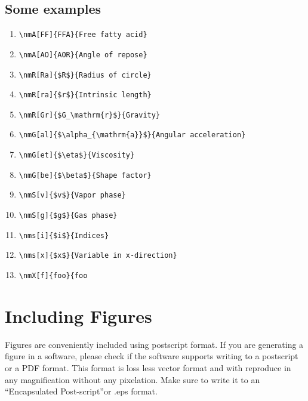 \subsection{Some examples}
\begin{enumerate}
\item \verb|\nmA[FF]{FFA}{Free fatty acid}|
\item \verb|\nmA[AO]{AOR}{Angle of repose}|
\item \verb|\nmR[Ra]{$R$}{Radius of circle}|
\item \verb|\nmR[ra]{$r$}{Intrinsic length}|
\item \verb|\nmR[Gr]{$G_\mathrm{r}$}{Gravity}|
\item \verb|\nmG[al]{$\alpha_{\mathrm{a}}$}{Angular acceleration}|
\item \verb|\nmG[et]{$\eta$}{Viscosity}|
\item \verb|\nmG[be]{$\beta$}{Shape factor}|
\item \verb|\nmS[v]{$v$}{Vapor phase}|
\item \verb|\nmS[g]{$g$}{Gas phase}|
\item \verb|\nms[i]{$i$}{Indices}|
\item \verb|\nms[x]{$x$}{Variable in x-direction}|
\item \verb|\nmX[f]{foo}{foo|
\end{enumerate} 











\newpage
\section{Including Figures}

Figures are conveniently included using postscript  format.  If you are
generating a figure in a software, please check if the software
supports writing to a postscript or a PDF format. This format is loss
less vector format and with reproduce in any magnification without any
pixelation. Make sure to write it to an ``Encapsulated Post-script''or
.eps format.


